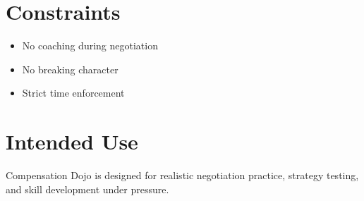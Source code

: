 \documentclass[11pt]{article}
\begin{document}
\section{Constraints}

\begin{itemize}
\item No coaching during negotiation
\item No breaking character
\item Strict time enforcement
\end{itemize}

\section{Intended Use}

Compensation Dojo is designed for realistic negotiation practice, strategy testing, and skill development under pressure.
\end{document}
